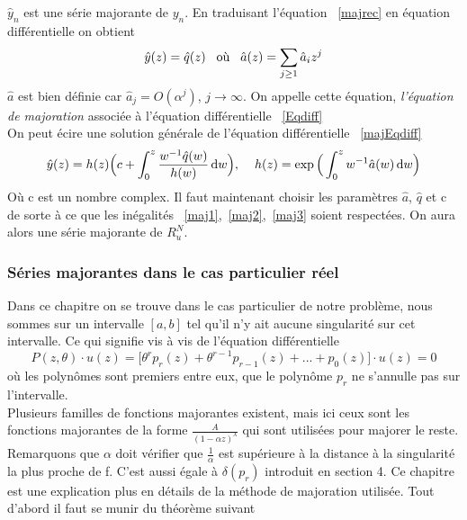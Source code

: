 \documentclass[a4paper,10.5pt]{article}
\begin{document}
	$\hat{y}_n$ est une série majorante de $y_n$. En traduisant l'équation ~\eqref{majrec} en équation différentielle on obtient
	\begin{equation}
	[\theta-\hat{a}(z)] \hat{y}(z) = \hat{q}(z) \hspace{3mm} \text{où} \hspace{3mm} \hat{a}(z)=\sum_{j \geq 1} \hat{a}_iz^j
	\label{majEqdiff}
	\end{equation}
	$\hat{a}$ est bien définie car $\hat{a}_j=O(\alpha^j)$, $j \rightarrow \infty$. On appelle cette équation, \textit{l'équation de majoration} associée à l'équation différentielle ~\eqref{Eqdiff}\\
	On peut écire une solution générale de l'équation différentielle ~\eqref{majEqdiff} 
	\begin{equation}
	\hat{y}(z)=h(z)\Big(c+\int_{0}^{z}\frac{w^{-1}\hat{q}(w)}{h(w)}\, \mathrm{d}w\Big), \hspace{4mm} h(z)=\exp\Big(\int_{0}^{z}w^{-1}\hat{a}(w)\, \mathrm{d}w\Big)
	\end{equation}
	Où c est un nombre complex. Il faut maintenant choisir les paramètres $\hat{a}$, $\hat{q}$ et c de sorte à ce que les inégalités ~\eqref{maj1},~\eqref{maj2},~\eqref{maj3} soient respectées. On aura alors une série majorante de $R_u^{N}$.
	
	\subsubsection{Séries majorantes dans le cas particulier réel}
	
	Dans ce chapitre on se trouve dans le cas particulier de notre problème, nous sommes sur un intervalle $[a,b]$ tel qu'il n'y ait aucune singularité sur cet intervalle. Ce qui signifie vis à vis de l'équation différentielle
	\[P(z,\theta) \cdot u(z)=\big[\theta^{r}p_r(z)+\theta^{r-1}p_{r-1}(z)+...+p_0(z)\big]\cdot u(z)=0 \tag{*}\]
	où les polynômes sont premiers entre eux, que le polynôme $p_r$ ne s'annulle pas sur l'intervalle.\\
	
	Plusieurs familles de fonctions majorantes existent, mais ici ceux sont les  fonctions majorantes de la forme $\frac{A}{(1-\alpha z)^\lambda}$ qui sont utilisées pour majorer le reste. Remarquons que $\alpha$ doit vérifier que $\frac{1}{\alpha}$ est supérieure à la distance à la singularité la plus proche de f. C'est aussi égale à $\delta(p_r)$ introduit en section 4.
	Ce chapitre est une explication plus en détails de la méthode de majoration utilisée. Tout d'abord il faut se munir du théorème suivant
	
\end{document}
